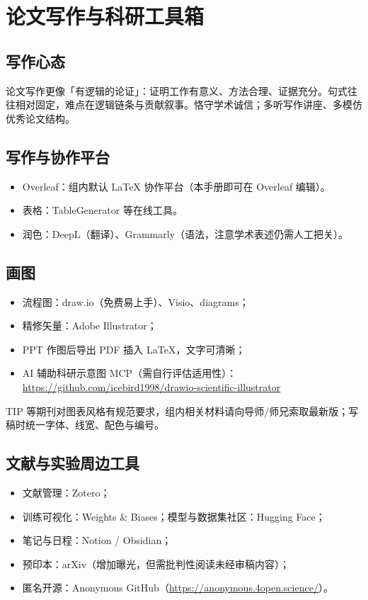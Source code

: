\section{论文写作与科研工具箱}

\subsection{写作心态}
论文写作更像「有逻辑的论证」：证明工作有意义、方法合理、证据充分。句式往往相对固定，难点在逻辑链条与贡献叙事。恪守学术诚信；多听写作讲座、多模仿优秀论文结构。

\subsection{写作与协作平台}
\begin{itemize}
  \item Overleaf：组内默认 LaTeX 协作平台（本手册即可在 Overleaf 编辑）。
  \item 表格：TableGenerator 等在线工具。
  \item 润色：DeepL（翻译）、Grammarly（语法，注意学术表述仍需人工把关）。
\end{itemize}

\subsection{画图}
\begin{itemize}
  \item 流程图：draw.io（免费易上手）、Visio、diagrams；
  \item 精修矢量：Adobe Illustrator；
  \item PPT 作图后导出 PDF 插入 LaTeX，文字可清晰；
  \item AI 辅助科研示意图 MCP（需自行评估适用性）：\\
        \url{https://github.com/icebird1998/drawio-scientific-illustrator}
\end{itemize}
TIP 等期刊对图表风格有规范要求，组内相关材料请向导师/师兄索取最新版；写稿时统一字体、线宽、配色与编号。

\subsection{文献与实验周边工具}
\begin{itemize}
  \item 文献管理：Zotero；
  \item 训练可视化：Weights \& Biases；模型与数据集社区：Hugging Face；
  \item 笔记与日程：Notion / Obsidian；
  \item 预印本：arXiv（增加曝光，但需批判性阅读未经审稿内容）；
  \item 匿名开源：Anonymous GitHub（\url{https://anonymous.4open.science/}）。
\end{itemize}

